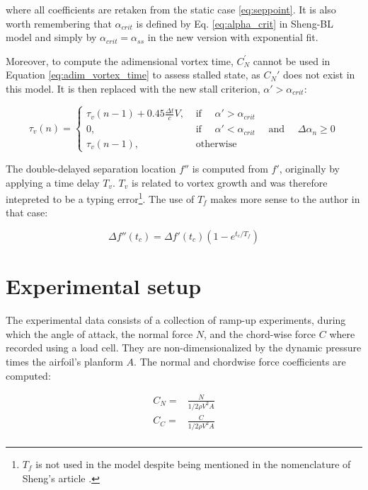 \noindent where all coefficients are retaken from the static case \eqref{eq:seppoint}. It is also worth remembering that $\alpha_{crit}$ is defined by Eq. \eqref{eq:alpha_crit} in Sheng-BL model and simply by $\alpha_{crit} = \alpha_{ss}$ in the new version with exponential fit. 

Moreover, to compute the adimensional vortex time, $C_N^{\prime}$ cannot be used in Equation \eqref{eq:adim_vortex_time} to assess stalled state, as $C_N'$ does not exist in this model. It is then replaced with the new stall criterion, $\alpha'>\alpha_{crit}$:

\begin{equation}
	\tau_{v}(n)=\left\{\begin{array}{ll}
		\tau_{v}(n-1)+0.45 \frac{\Delta t}{c} V, & \text { if } \quad \alpha'>\alpha_{crit}\\
		0, & \text { if } \quad \alpha'<\alpha_{crit} \quad \text { and } \quad \Delta \alpha_{n} \geq 0 \\
		\tau_{v}(n-1), & \text { otherwise }
		\end{array}\right.
	\label{eq:adim_vortex_time_sheng}	
\end{equation}

The double-delayed separation location $f''$ is computed from $f'$, originally by applying a time delay $T_v$.  $T_v$ is related to vortex growth and was therefore intepreted to be a typing error\footnote{$T_f$ is not used in the model despite being mentioned in the nomenclature of Sheng's article \cite{sheng_modified_2008}.}. The use of $T_f$ makes more sense to the author in that case: 

\begin{equation}
	\Delta f''(t_c) = \Delta f'(t_c)(1-e^{t_c/T_f})
	\label{eq:fpp_sheng}
\end{equation}



\section{Experimental setup}
\label{section:exp_setup}
The experimental data consists of a collection of ramp-up experiments, during which the angle of attack, the normal force $N$, and the chord-wise force $C$ where recorded using a load cell. They are non-dimensionalized by the dynamic pressure times the airfoil's planform $A$. The normal and chordwise force coefficients are computed: 

\begin{eqnarray}
	C_N =& \frac{N}{1/2 \rho V^2 A} \\
	C_C =& \frac{C}{1/2 \rho V^2 A} \\
	\label{eq:force_coeffs}
\end{eqnarray}

